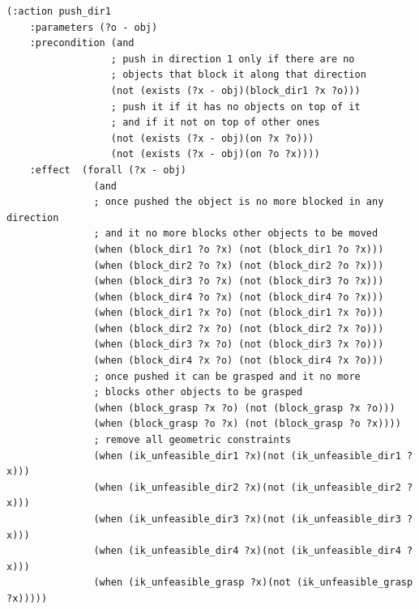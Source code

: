 \lstset{language=pddl}
\begin{lstlisting}[caption={PDDL syntax of the pushing action along direction 1},label=pushPDDL]
(:action push_dir1
    :parameters (?o - obj)
    :precondition (and
                  ; push in direction 1 only if there are no
                  ; objects that block it along that direction
                  (not (exists (?x - obj)(block_dir1 ?x ?o)))
                  ; push it if it has no objects on top of it
                  ; and if it not on top of other ones
                  (not (exists (?x - obj)(on ?x ?o)))
                  (not (exists (?x - obj)(on ?o ?x))))
    :effect  (forall (?x - obj)
               (and
               ; once pushed the object is no more blocked in any direction
               ; and it no more blocks other objects to be moved
               (when (block_dir1 ?o ?x) (not (block_dir1 ?o ?x)))
               (when (block_dir2 ?o ?x) (not (block_dir2 ?o ?x)))
               (when (block_dir3 ?o ?x) (not (block_dir3 ?o ?x)))
               (when (block_dir4 ?o ?x) (not (block_dir4 ?o ?x)))
               (when (block_dir1 ?x ?o) (not (block_dir1 ?x ?o)))
               (when (block_dir2 ?x ?o) (not (block_dir2 ?x ?o)))
               (when (block_dir3 ?x ?o) (not (block_dir3 ?x ?o)))
               (when (block_dir4 ?x ?o) (not (block_dir4 ?x ?o)))
               ; once pushed it can be grasped and it no more
               ; blocks other objects to be grasped
               (when (block_grasp ?x ?o) (not (block_grasp ?x ?o)))
               (when (block_grasp ?o ?x) (not (block_grasp ?o ?x))))
               ; remove all geometric constraints 
               (when (ik_unfeasible_dir1 ?x)(not (ik_unfeasible_dir1 ?x)))
               (when (ik_unfeasible_dir2 ?x)(not (ik_unfeasible_dir2 ?x)))
               (when (ik_unfeasible_dir3 ?x)(not (ik_unfeasible_dir3 ?x)))
               (when (ik_unfeasible_dir4 ?x)(not (ik_unfeasible_dir4 ?x)))
               (when (ik_unfeasible_grasp ?x)(not (ik_unfeasible_grasp ?x)))))
\end{lstlisting}

\mbox{}


